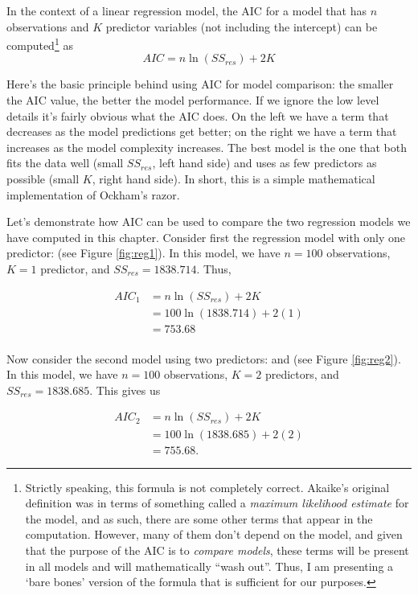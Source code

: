 \vspace{0.5cm}
\begin{mdframed}[style=MyFrame,nobreak=true]
In the context of a linear regression model, the AIC for a model that has $n$ observations and $K$ predictor variables (not including the intercept) can be computed\footnote{Strictly speaking, this formula is not completely correct.  Akaike's original definition was in terms of something called a \emph{maximum likelihood estimate} for the model, and as such, there are some other terms that appear in the computation.  However, many of them don't depend on the model, and given that the purpose of the AIC is to \emph{compare models}, these terms will be present in all models and will mathematically ``wash out''.  Thus, I am presenting a `bare bones' version of the formula that is sufficient for our purposes.} as
$$
AIC = n\ln(SS_{res}) + 2K
$$
\end{mdframed}

Here's the basic principle behind using AIC for model comparison:  the smaller the AIC value, the better the model performance. If we ignore the low level details it's fairly obvious what the AIC does. On the left we have a term that decreases as the model predictions get better; on the right we have a term that increases as the model complexity increases. The best model is the one that both fits the data well (small $SS_{res}$, left hand side) and uses as few predictors as possible (small $K$, right hand side). In short, this is a simple mathematical implementation of Ockham's razor. 

Let's demonstrate how AIC can be used to compare the two regression models we have computed in this chapter. Consider first the regression model with only one predictor:  (see Figure \ref{fig:reg1}). In this model, we have $n=100$ observations, $K=1$ predictor, and $SS_{res}=1838.714$.  Thus,

\begin{align*}
  AIC_1 &= n\ln(SS_{res})+2K\\
        &= 100\ln(1838.714) + 2(1)\\
  &= 753.68\\
\end{align*}

Now consider the second model using two predictors:  and  (see Figure \ref{fig:reg2}).  In this model, we have $n=100$ observations, $K=2$ predictors, and $SS_{res}=1838.685$.  This gives us

\begin{align*}
  AIC_2 &= n\ln(SS_{res})+2K\\
        &= 100\ln(1838.685) + 2(2)\\
  &= 755.68.
\end{align*}


